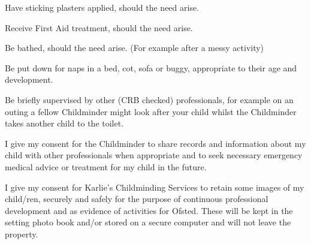 \documentclass[10pt]{article}
\begin{document}
\sigtable

Have sticking plasters applied, should the need arise.

\sigtable

\pagebreak

Receive First Aid treatment, should the need arise.

\sigtable

Be bathed, should the need arise.  (For example after a messy activity)

\sigtable

Be put down for naps in a bed, cot, sofa or buggy, appropriate to their age and development.

\sigtable

Be briefly supervised by other (CRB checked) professionals, for example on an outing a fellow Childminder might look after your child whilst the Childminder takes another child to the toilet.

\sigtable

I give my consent for the Childminder to share records and information about my child with other professionals when appropriate and to seek necessary emergency medical advice or treatment for my child in the future.

\sigtable

I give my consent for Karlie's Childminding Services to retain some images of my child/ren, securely and safely for the purpose of continuous professional development and as evidence of activities for Ofsted. These will be kept in the setting photo book and/or stored on a secure computer and will not leave the property.

\sigtable


\end{document}
